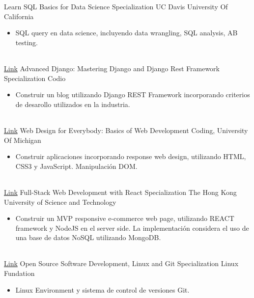 \documentclass[letterpaper]{DS_class_file} %
\begin{document}
\begin{twenty}
	{}
	{\hspace{0.1cm}Learn SQL Basics for Data Science Specialization}
	{UC Davis University Of California}
	{}
	{
		{\begin{itemize}
				\item SQL query en data science, incluyendo  data wrangling, SQL analysis, AB testing. %
		\end{itemize}}
	}
	\\
	\twentyitem
	{\href{https://portfolio-mparraf.herokuapp.com/static/shared/Advanced Django Mastering Specialization.pdf}{Link}}
	{}
	{\hspace{0.1cm}Advanced Django: Mastering Django and Django Rest Framework Specialization}
	{Codio}
	{}
	{
		{\begin{itemize}
				\item Construir un blog utilizando Django REST Framework incorporando criterios de desarollo utilizados en la industria.
		\end{itemize}}
	}
	\\
	\twentyitem
	{\href{https://portfolio-mparraf.herokuapp.com/static/shared/Web Design for Everybody Specialization.pdf}{Link}}
	{}
	{\hspace{0.1cm}Web Design for Everybody: Basics of Web Development  Coding,}
	{University Of Michigan}
	{}
	{
		{\begin{itemize}
				\item Construir aplicaciones incorporando response web design, utilizando HTML, CSS3 y JavaScript. Manipulación DOM.
		\end{itemize}}
	}
	\\
	\twentyitem
	{\href{https://portfolio-mparraf.herokuapp.com/static/shared/Full-Stack Web Development with React.pdf}{Link}}
	{}
	{\hspace{0.1cm}Full-Stack Web Development with React Specialization}
	{The Hong Kong University of Science and Technology}
	{}
	{
		{\begin{itemize}
				\item Construir un MVP responsive e-commerce web page, utilizando REACT framework y NodeJS en el server side. La implementación considera el uso de una base de datos NoSQL utilizando MongoDB.
		\end{itemize}}
	}
	\\
	\twentyitem
	{\href{https://portfolio-mparraf.herokuapp.com/static/shared/Open Source Software Development, Linux and Git.pdf}{Link}}
	{}
	{\hspace{0.1cm}Open Source Software Development, Linux and Git Specialization}
	{Linux Fundation}
	{}
	{
		{\begin{itemize}
				\item Linux Environment y sistema de control de versiones Git.
		\end{itemize}}
	}

\end{twenty}
\end{document}
